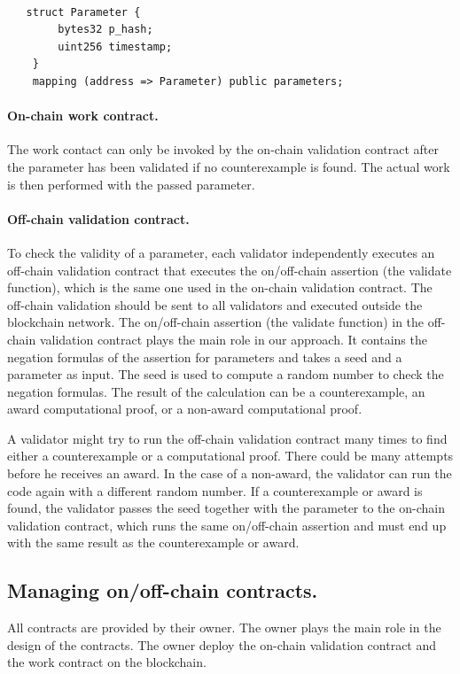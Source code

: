 \documentclass[runningheads]{llncs}
\begin{document}
\begin{lstlisting}[numbers=none]

   struct Parameter {
        bytes32 p_hash;
        uint256 timestamp;
    }
    mapping (address => Parameter) public parameters;
\end{lstlisting}
 


\paragraph{On-chain work contract.}  The work contact can only be invoked by the on-chain validation contract after the parameter has been validated if no counterexample is found. The actual work is then performed with the passed parameter.

\paragraph{Off-chain validation contract.}
To check the validity of a parameter, each validator independently executes an off-chain validation contract that executes the on/off-chain assertion (the validate function), which is the same one used in the on-chain validation contract. The off-chain validation should be sent to all validators and executed outside the blockchain network. The on/off-chain assertion (the validate function) in the off-chain validation contract plays the main role in our approach. It contains the negation formulas of the assertion for parameters and takes a seed and a parameter as input. The seed is used to compute a random number to check the negation formulas. The result of the calculation can be a counterexample, an award computational proof, or a non-award computational proof.

A validator might try to run the off-chain validation contract many times to find either a counterexample or a computational proof. There could be many attempts before he receives an award. In the case of a non-award, the validator can run the code again with a different random number. If a counterexample or award is found, the validator passes the seed together with the parameter to the on-chain validation contract, which runs the same on/off-chain assertion and must end up with the same result as the counterexample or award.

\subsection{Managing on/off-chain contracts.}
All contracts are provided by their owner. The owner plays the main role in the design of the contracts. The owner deploy the on-chain validation contract and the work contract on the blockchain. 
\end{document}
